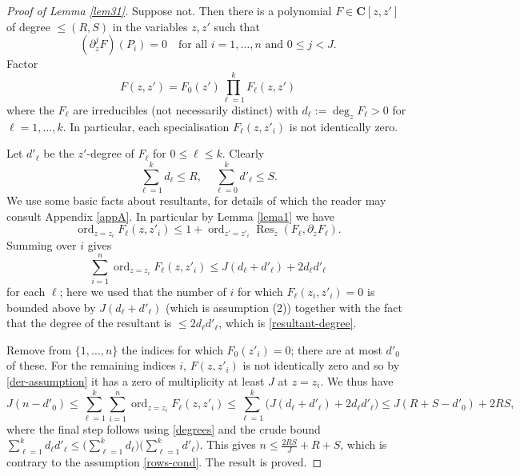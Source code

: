 \documentclass[11pt,reqno]{amsart}
\numberwithin{equation}{section}
\newcommand{\C}{\mathbf{C}}
\newcommand{\ord}{\operatorname{ord}}
\newcommand{\Res}{\operatorname{Res}}
\renewcommand{\le}{\leqslant}
\begin{document}
\begin{proof}[Proof of Lemma \ref{lem31}]
Suppose not. Then there is a polynomial $F \in \C[z,z']$ of degree $\le (R,S)$ in the variables $z, z'$ such that \begin{equation}\label{der-assumption} (\partial_z^j F)(P_i) = 0 \quad \mbox{for all $i = 1,\dots, n$ and $0 \le j < J$}.\end{equation} Factor \[ F(z,z') = F_0(z') \prod_{\ell = 1}^k F_{\ell}(z,z')\] where the $F_{\ell}$ are irreducibles (not necessarily distinct) with $d_{\ell} := \deg_z F_{\ell} > 0$ for $\ell = 1,\dots, k$. In particular, each specialisation $F_{\ell}(z, z'_i)$ is not identically zero.

Let $d'_{\ell}$ be the $z'$-degree of $F_{\ell}$ for $0 \le \ell \le k$. Clearly
\begin{equation}\label{degrees} \sum_{\ell = 1}^k d_{\ell} \le R, \quad \sum_{\ell=0}^k d'_{\ell} \le S.\end{equation}
We use some basic facts about resultants, for details of which the reader may consult Appendix \ref{appA}. In particular by Lemma \ref{lema1} we have
\begin{equation}\label{ords} \ord_{z = z_i} F_{\ell}(z, z'_i) \le 1 + \ord_{z' = z'_i} \Res_z(F_{\ell}, \partial_z F_{\ell}).\end{equation}
Summing over $i$ gives
\begin{equation}\label{ord-vanish-claim} \sum_{i = 1}^n \ord_{z = z_i} F_{\ell}(z, z'_i) \le J(d_{\ell} + d'_{\ell}) + 2 d_{\ell} d'_{\ell}\end{equation}
for each $\ell$; here we used that the number of $i$ for which $F_{\ell}(z_i, z'_i) = 0$ is bounded above by $J(d_{\ell} + d'_{\ell})$ (which is assumption (2)) together with the fact that the degree of the resultant is $\le 2 d_{\ell} d'_{\ell}$, which is \eqref{resultant-degree}. 

Remove from $\{1,\dots, n\}$ the indices for which $F_0(z'_i) = 0$; there are at most $d'_0$ of these. For the remaining indices $i$, $F(z, z'_i)$ is not identically zero and so by \eqref{der-assumption} it has a zero of multiplicity at least $J$ at $z = z_i$. We thus have
\[ J(n - d'_0)  \le \sum_{\ell = 1}^k \sum_{i= 1}^n \ord_{z = z_i} F_{\ell}(z, z'_i) \le \sum_{\ell = 1}^k \big( J(d_{\ell} + d'_{\ell}) + 2 d_{\ell} d'_{\ell} \big) \le J(R+S - d'_0) + 2RS,\]
where the final step follows using \eqref{degrees} and the crude bound $\sum_{\ell=1}^k d_{\ell} d'_{\ell} \le \big( \sum_{\ell = 1}^k d_{\ell} \big) \big( \sum_{\ell = 1}^k d'_{\ell} \big)$. This gives $n \le \frac{2RS}{J} + R + S$, which is contrary to the assumption \eqref{rows-cond}. The result is proved.
\end{proof}
\end{document}
